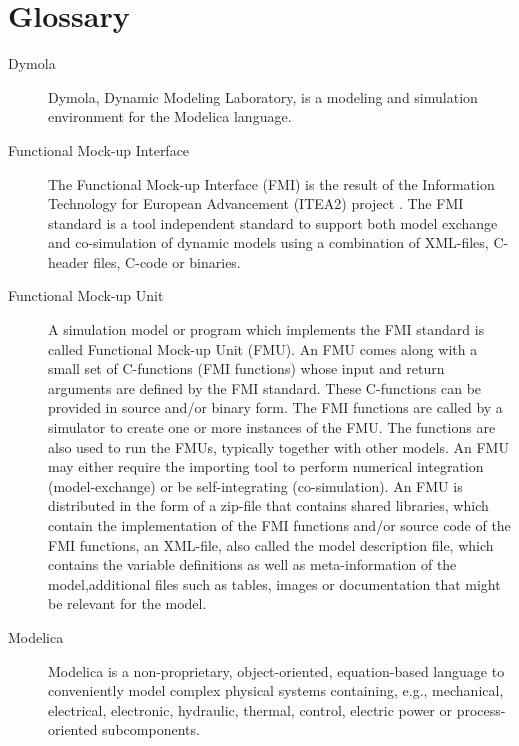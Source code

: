 \documentclass[letterpaper,10pt,english]{sphinxmanual}
\begin{document}
\chapter{Glossary}
\label{glossary:glossary}\label{glossary::doc}\begin{description}
\item[{Dymola}] \leavevmode{}\label{glossary:term-dymola}
Dymola, Dynamic Modeling Laboratory, is a modeling and simulation environment for the Modelica language.

\item[{Functional Mock-up Interface}] \leavevmode{}\label{glossary:term-functional-mock-up-interface}
The Functional Mock-up Interface (FMI) is the result of the Information Technology for European Advancement (ITEA2) project  {\hyperref[glossary:term\string-modelisar]{\emph{}}}.
The FMI standard is a tool independent standard to support both model exchange and co-simulation of dynamic models using a combination of XML-files, C-header files, C-code or binaries.

\item[{Functional Mock-up Unit}] \leavevmode{}\label{glossary:term-functional-mock-up-unit}
A simulation model or program which implements the FMI standard is called Functional Mock-up Unit (FMU).
An FMU comes along with a small set of C-functions (FMI functions) whose input and return arguments are defined by the FMI standard.
These C-functions can be provided in source and/or binary form. The FMI functions are called by a simulator to create one or more instances of the FMU.
The functions are also used to run the FMUs, typically together with other models. An FMU may either require the importing tool
to perform numerical integration (model-exchange) or be self-integrating (co-simulation). An FMU is distributed in the form of a zip-file that contains shared libraries, which contain the implementation of the FMI functions and/or source code of the FMI functions, an XML-file, also called the model description file, which contains the variable definitions as well as meta-information of the model,additional files such as tables, images or documentation that might be relevant for the model.

\item[{Modelica}] \leavevmode{}\label{glossary:term-modelica}
Modelica is a non-proprietary, object-oriented, equation-based language to conveniently model complex physical systems containing,
e.g., mechanical, electrical, electronic, hydraulic, thermal, control, electric power or process-oriented subcomponents.


\end{description}
\end{document}
